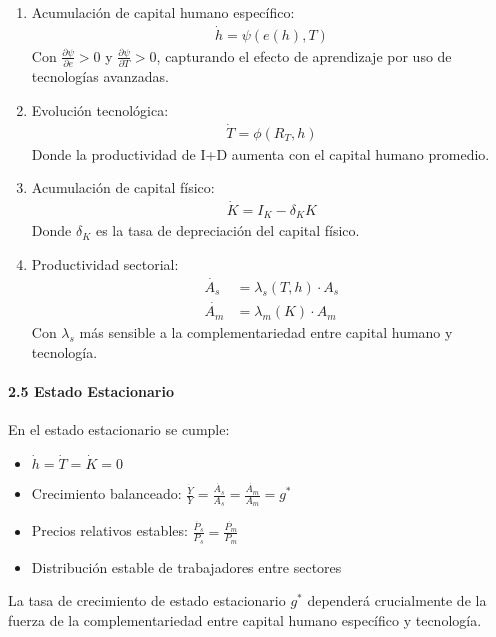\documentclass{article}
\theoremstyle{remark}
\theoremstyle{definition}
\begin{document}
\begin{tcolorbox}
\begin{enumerate}
\item Acumulación de capital humano específico:
\begin{align}
\dot{h} = \psi(e(h), T)
\end{align}
Con $\frac{\partial \psi}{\partial e} > 0$ y $\frac{\partial \psi}{\partial T} > 0$, capturando el efecto de aprendizaje por uso de tecnologías avanzadas.

\item Evolución tecnológica:
\begin{align}
\dot{T} = \phi(R_T, h)
\end{align}
Donde la productividad de I+D aumenta con el capital humano promedio.

\item Acumulación de capital físico:
\begin{align}
\dot{K} = I_K - \delta_K K
\end{align}
Donde $\delta_K$ es la tasa de depreciación del capital físico.

\item Productividad sectorial:
\begin{align}
\dot{A_s} &= \lambda_s(T, h) \cdot A_s\\
\dot{A_m} &= \lambda_m(K) \cdot A_m
\end{align}
Con $\lambda_s$ más sensible a la complementariedad entre capital humano y tecnología.
\end{enumerate}

\paragraph{2.5 Estado Estacionario}
En el estado estacionario se cumple:
\begin{itemize}
\item $\dot{h} = \dot{T} = \dot{K} = 0$
\item Crecimiento balanceado: $\frac{\dot{Y}}{Y} = \frac{\dot{A_s}}{A_s} = \frac{\dot{A_m}}{A_m} = g^*$
\item Precios relativos estables: $\frac{\dot{P_s}}{P_s} = \frac{\dot{P_m}}{P_m}$
\item Distribución estable de trabajadores entre sectores
\end{itemize}

La tasa de crecimiento de estado estacionario $g^*$ dependerá crucialmente de la fuerza de la complementariedad entre capital humano específico y tecnología.


\end{tcolorbox}
\end{document}
